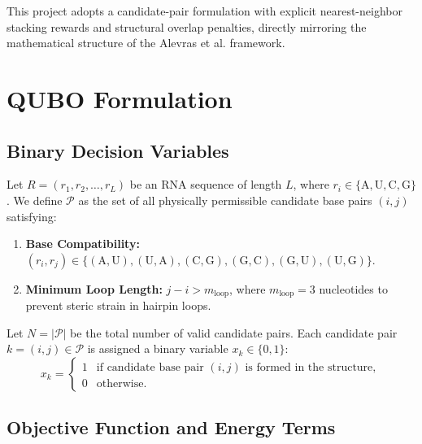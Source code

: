 \documentclass[11pt,a4paper]{article}
\begin{document}
	This project adopts a candidate-pair formulation with explicit nearest-neighbor stacking rewards and structural overlap penalties, directly mirroring the mathematical structure of the Alevras et al. framework.
	
	\clearpage
	
	\section{QUBO Formulation}
	\label{sec:formulation}
	
	\subsection{Binary Decision Variables}
	
	Let $R = (r_1, r_2, \dots, r_L)$ be an RNA sequence of length $L$, where $r_i \in \{\text{A}, \text{U}, \text{C}, \text{G}\}$. We define $\mathcal{P}$ as the set of all physically permissible candidate base pairs $(i, j)$ satisfying:
	\begin{enumerate}[leftmargin=1.2cm]
		\item \textbf{Base Compatibility:} $(r_i, r_j) \in \{(\text{A},\text{U}), (\text{U},\text{A}), (\text{C},\text{G}), (\text{G},\text{C}), (\text{G},\text{U}), (\text{U},\text{G})\}$.
		\item \textbf{Minimum Loop Length:} $j - i > m_{\text{loop}}$, where $m_{\text{loop}} = 3$ nucleotides to prevent steric strain in hairpin loops.
	\end{enumerate}
	
	Let $N = |\mathcal{P}|$ be the total number of valid candidate pairs. Each candidate pair $k = (i, j) \in \mathcal{P}$ is assigned a binary variable $x_k \in \{0, 1\}$:
	\begin{equation}
		x_k = \begin{cases} 
			1 & \text{if candidate base pair } (i, j) \text{ is formed in the structure}, \\
			0 & \text{otherwise.}
		\end{cases}
	\end{equation}
	
	\subsection{Objective Function and Energy Terms}
	
\end{document}
